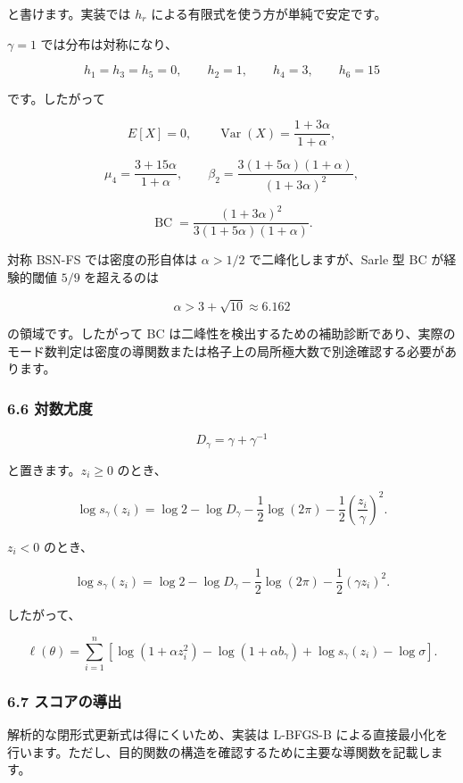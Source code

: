 \documentclass[
]{article}
\begin{document}
と書けます。実装では \(h_r\) による有限式を使う方が単純で安定です。

\(\gamma=1\) では分布は対称になり、

\[
h_1=h_3=h_5=0,\qquad h_2=1,\qquad h_4=3,\qquad h_6=15
\]

です。したがって

\[
E[X]=0,\qquad
\operatorname{Var}(X)=\frac{1+3\alpha}{1+\alpha},
\]

\[
\mu_4=\frac{3+15\alpha}{1+\alpha},
\qquad
\beta_2=
\frac{3(1+5\alpha)(1+\alpha)}{(1+3\alpha)^2},
\]

\[
\operatorname{BC}
=
\frac{(1+3\alpha)^2}{3(1+5\alpha)(1+\alpha)}.
\]

対称 BSN-FS では密度の形自体は \(\alpha>1/2\) で二峰化しますが、Sarle 型
BC が経験的閾値 \(5/9\) を超えるのは

\[
\alpha>3+\sqrt{10}\approx6.162
\]

の領域です。したがって BC
は二峰性を検出するための補助診断であり、実際のモード数判定は密度の導関数または格子上の局所極大数で別途確認する必要があります。

\hypertarget{ux5bfeux6570ux5c24ux5ea6-3}{%
\subsubsection{6.6 対数尤度}\label{ux5bfeux6570ux5c24ux5ea6-3}}

\[
D_\gamma=\gamma+\gamma^{-1}
\]

と置きます。\(z_i\ge0\) のとき、

\[
\log s_\gamma(z_i)
=\log2-\log D_\gamma-\frac{1}{2}\log(2\pi)-\frac{1}{2}\left(\frac{z_i}{\gamma}\right)^2.
\]

\(z_i<0\) のとき、

\[
\log s_\gamma(z_i)
=\log2-\log D_\gamma-\frac{1}{2}\log(2\pi)-\frac{1}{2}(\gamma z_i)^2.
\]

したがって、

\[
\ell(\theta)=
\sum_{i=1}^{n}\left[
\log(1+\alpha z_i^2)-\log(1+\alpha b_\gamma)
+\log s_\gamma(z_i)-\log\sigma
\right].
\]

\hypertarget{ux30b9ux30b3ux30a2ux306eux5c0eux51fa-1}{%
\subsubsection{6.7
スコアの導出}\label{ux30b9ux30b3ux30a2ux306eux5c0eux51fa-1}}

解析的な閉形式更新式は得にくいため、実装は L-BFGS-B
による直接最小化を行います。ただし、目的関数の構造を確認するために主要な導関数を記載します。
\end{document}
